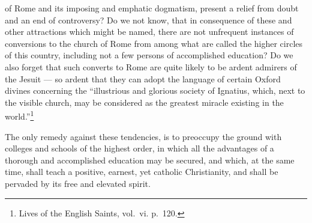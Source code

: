\documentclass[]{book}
\let\rmarkdownfootnote\footnote%
\def\footnote{\protect\rmarkdownfootnote}
\begin{document}
of Rome and its imposing and emphatic dogmatism, present a relief from doubt and an end of controversy? Do we not know, that in consequence of these and other attractions which might be named, there are not unfrequent instances of conversions to the church of Rome from among what are called the higher circles of this country, including not a few persons of accomplished education? Do we also forget that such converts to Rome are quite likely to be ardent admirers of the Jesuit --- so ardent that they can adopt the language of certain Oxford divines concerning the ``illustrious and glorious society of Ignatius, which, next to the visible church, may be considered as the greatest miracle existing in the world.''\footnote{Lives of the English Saints, vol.~vi. p.~120.}

The only remedy against these tendencies, is to preoccupy the ground with colleges and schools of the highest order, in which all the advantages of a thorough and accomplished education may be secured, and which, at the same time, shall teach a positive, earnest, yet catholic Christianity, and shall be pervaded by its free and elevated spirit.
\end{document}
